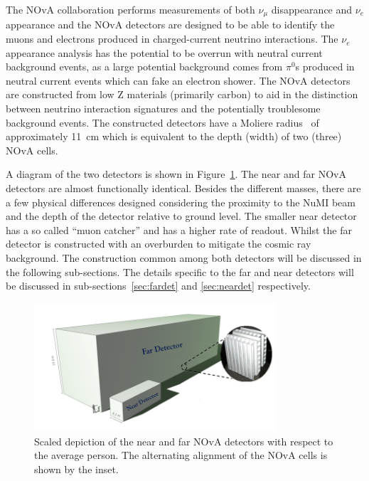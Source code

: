 The NOvA collaboration performs measurements of both $\nu_{\mu}$
disappearance and $\nu_e$ appearance and the NOvA detectors are
designed to be able to identify the muons and electrons produced in
charged-current neutrino interactions. 
The $\nu_e$ appearance
analysis has the potential to be overrun with neutral current
background events, 
as a large potential background comes from $\pi^0$s produced in
neutral current 
events which can fake an electron shower.
The NOvA detectors are constructed from low Z materials (primarily
carbon) to aid in the distinction between neutrino interaction
signatures and the potentially troublesome background events.
The constructed detectors have a Moliere radius~\cite{pdg} of
approximately 11~cm which is equivalent to the depth (width) of two
(three) NOvA cells.  

A diagram of the two detectors
is shown in Figure~\ref{fig:bothDets}. 
The near and far NOvA detectors are almost functionally
identical. Besides
the different masses, there are a few physical
differences designed considering the proximity to the NuMI beam and
the depth of the detector relative to ground level. 
The smaller near detector has a so called ``muon catcher'' and
has a higher rate of readout. 
Whilst the far detector is constructed with an overburden to mitigate
the cosmic ray background.
The
construction common among both detectors will be discussed in the
following sub-sections. The details specific to the far and near detectors
will be discussed in sub-sections~\ref{sec:fardet} and
\ref{sec:neardet} respectively.

\begin{figure}
  \centering
  \includegraphics[width=0.8\textwidth]{../../img/det/gen/both_detectors.png} 
  \caption{
    Scaled depiction of the near and far NOvA
    detectors with respect to the average person.
    The alternating alignment of the NOvA
    cells is shown by the inset. }
  \label{fig:bothDets}
\end{figure} 


